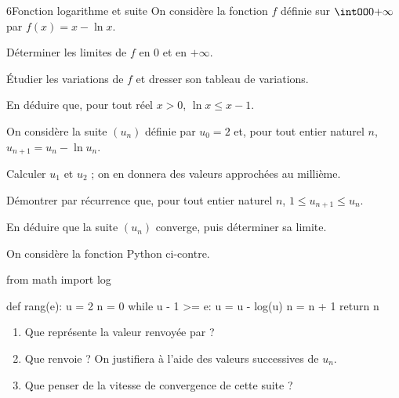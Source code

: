 \begin{exoBac}{6}{Fonction logarithme et suite}
On considère la fonction $f$ définie sur $\intOO0{+\infty}$ par $f(x)=x-\ln x$.
\begin{questions}
  \item Déterminer les limites de $f$ en $0$ et en $+\infty$.
  \item Étudier les variations de $f$ et dresser son tableau de variations.
  \item En déduire que, pour tout réel $x>0$, $\ln x\leq x-1$.
\end{questions}
On considère la suite $(u_n)$ définie par $u_0=2$ et, pour tout entier naturel $n$, $u_{n+1}=u_n-\ln u_n$.
\begin{questions}[resume]
  \item Calculer $u_1$ et $u_2$ ; on en donnera des valeurs approchées au millième.
  \item Démontrer par récurrence que, pour tout entier naturel $n$, $1\leq u_{n+1}\leq u_n$.
  \item En déduire que la suite $(u_n)$ converge, puis déterminer sa limite.
  \item On considère la fonction Python ci-contre.
\begin{codecote}[0.44]
\begin{pythoncol}
from math import log

def rang(e):
    u = 2
    n = 0
    while u - 1 >= e:
        u = u - log(u)
        n = n + 1
    return n
\end{pythoncol}
\cote
\begin{enumerate}[label=\alph*),leftmargin=1.4em,itemsep=0.6mm,topsep=0mm]
  \item Que représente la valeur renvoyée par  ?
  \item Que renvoie  ? On justifiera à l'aide des valeurs successives de $u_n$.
  \item Que penser de la vitesse de convergence de cette suite ?
\end{enumerate}
\end{codecote}
\end{questions}
\end{exoBac}

